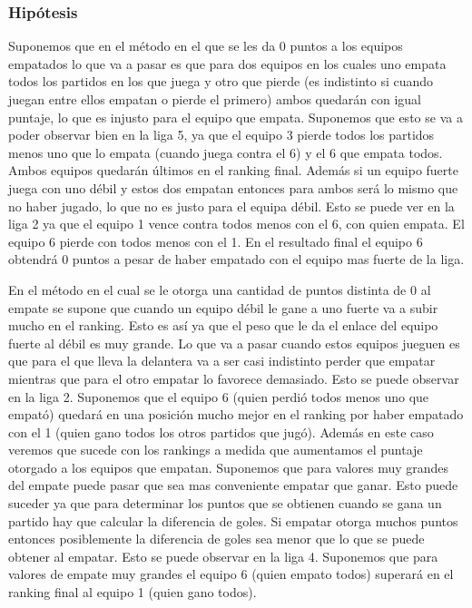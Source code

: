             \subsubsection*{Hipótesis}
            Suponemos que en el método en el que se les da 0 puntos a los equipos empatados lo que va a pasar es que para dos equipos en los cuales uno empata todos los partidos en los que juega y otro que pierde (es indistinto si cuando juegan entre ellos empatan o pierde el primero) ambos quedarán con igual puntaje, lo que es injusto para el equipo que empata. Suponemos que esto se va a poder observar bien en la liga 5, ya que el equipo 3 pierde todos los partidos menos uno que lo empata (cuando juega contra el 6) y el 6 que empata todos. Ambos equipos quedarán últimos en el ranking final. Además si un equipo fuerte juega con uno débil y estos dos empatan entonces para ambos será lo mismo que no haber jugado, lo que no es justo para el equipa débil. Esto se puede ver en la liga 2 ya que el equipo 1 vence contra todos menos con el 6, con quien empata. El equipo 6 pierde con todos menos con el 1. En el resultado final el equipo 6 obtendrá 0 puntos a pesar de haber empatado con el equipo mas fuerte de la liga.

            En el método en el cual se le otorga una cantidad de puntos distinta de 0 al empate se supone que cuando un equipo débil le gane a uno fuerte va a subir mucho en el ranking. Esto es así ya que el peso que le da el enlace del equipo fuerte al débil es muy grande. Lo que va a pasar cuando estos equipos jueguen es que para el que lleva la delantera va a ser casi indistinto perder que empatar mientras que para el otro empatar lo favorece demasiado. Esto se puede observar en la liga 2. Suponemos que el equipo 6 (quien perdió todos menos uno que empató) quedará en una posición mucho mejor en el ranking por haber empatado con el 1 (quien gano todos los otros partidos que jugó). Además en este caso veremos que sucede con los rankings a medida que aumentamos el puntaje otorgado a los equipos que empatan. Suponemos que para valores muy grandes del empate puede pasar que sea mas conveniente empatar que ganar. Esto puede suceder ya que para determinar los puntos que se obtienen cuando se gana un partido hay que calcular la diferencia de goles. Si empatar otorga muchos puntos entonces posiblemente la diferencia de goles sea menor que lo que se puede obtener al empatar. Esto se puede observar en la liga 4. Suponemos que para valores de empate muy grandes el equipo 6 (quien empato todos) superará en el ranking final al equipo 1 (quien gano todos).


